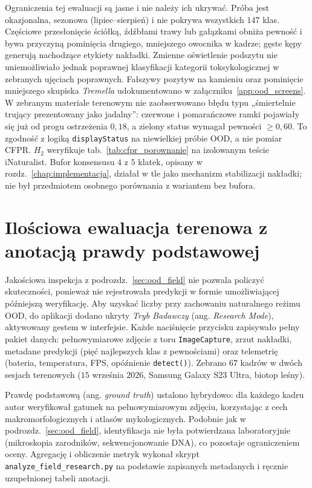 Ograniczenia tej ewaluacji są jasne i nie należy ich ukrywać. Próba jest okazjonalna, sezonowa (lipiec--sierpień) i nie pokrywa wszystkich $147$ klas. Częściowe przesłonięcie ściółką, źdźbłami trawy lub gałązkami obniża pewność i bywa przyczyną pominięcia drugiego, mniejszego owocnika w kadrze; gęste kępy generują nachodzące etykiety nakładki. Zmienne oświetlenie podszytu nie uniemożliwiało jednak poprawnej klasyfikacji kategorii toksykologicznej w zebranych ujęciach poprawnych. Fałszywy pozytyw na kamieniu oraz pominięcie mniejszego skupiska \textit{Tremella} udokumentowano w załączniku~\ref{app:ood_screens}. W zebranym materiale terenowym nie zaobserwowano błędu typu „śmiertelnie trujący prezentowany jako jadalny”: czerwone i pomarańczowe ramki pojawiały się już od progu ostrzeżenia $0{,}18$, a zielony status wymagał pewności $\ge 0{,}60$. To zgodność z logiką \texttt{displayStatus} na niewielkiej próbie OOD, a nie pomiar CFPR. $H_2$ weryfikuje tab.~\ref{tab:cfpr_porownanie} na izolowanym teście iNaturalist. Bufor konsensusu $4$ z $5$ klatek, opisany w rozdz.~\ref{chap:implementacja}, działał w tle jako mechanizm stabilizacji nakładki; nie był przedmiotem osobnego porównania z wariantem bez bufora.

\section{Ilościowa ewaluacja terenowa z anotacją prawdy podstawowej}\label{sec:field_quant}
Jakościowa inspekcja z podrozdz.~\ref{sec:ood_field} nie pozwala policzyć skuteczności, ponieważ nie rejestrowała predykcji w formie umożliwiającej późniejszą weryfikację. Aby uzyskać liczby przy zachowaniu naturalnego reżimu OOD, do aplikacji dodano ukryty \textit{Tryb Badawczy} (ang. \textit{Research Mode}), aktywowany gestem w interfejsie. Każde naciśnięcie przycisku zapisywało pełny pakiet danych: pełnowymiarowe zdjęcie z toru \texttt{ImageCapture}, zrzut nakładki, metadane predykcji (pięć najlepszych klas z pewnościami) oraz telemetrię (bateria, temperatura, FPS, opóźnienie \texttt{detect()}). Zebrano $67$ kadrów w dwóch sesjach terenowych ($15$ września $2026$, Samsung Galaxy S23 Ultra, biotop leśny).

Prawdę podstawową (ang. \textit{ground truth}) ustalono hybrydowo: dla każdego kadru autor weryfikował gatunek na pełnowymiarowym zdjęciu, korzystając z cech makromorfologicznych i atlasów mykologicznych. Podobnie jak w podrozdz.~\ref{sec:ood_field}, identyfikacja nie była potwierdzana laboratoryjnie (mikroskopia zarodników, sekwencjonowanie DNA), co pozostaje ograniczeniem oceny. Agregację i obliczenie metryk wykonał skrypt \texttt{analyze\_field\_research.py} na podstawie zapisanych metadanych i ręcznie uzupełnionej tabeli anotacji.

